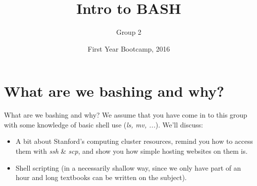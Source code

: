 \documentclass{beamer}
\begin{document}
\title{Intro to BASH}
\subtitle{Group 2}
\author{}
\date{First Year Bootcamp, 2016}
\frame{\titlepage}

\section{What are we bashing and why?}
\begin{frame}{What are we bashing and why?}
We assume that you have come in to this group with some knowledge of basic shell use (\emph{ls, mv, ...}). We'll discuss:\\
\begin{itemize}
    \item<2-> A bit about Stanford's computing cluster resources, remind you how to access them with \emph{ssh} \& \emph{scp}, and show you how simple hosting websites on them is. 
    \item<3-> Shell scripting (in a necessarily shallow way, since we only have part of an hour and long textbooks can be written on the subject). 
\end{itemize}
\begin{center}
\end{center}
\end{frame}
\end{document}
